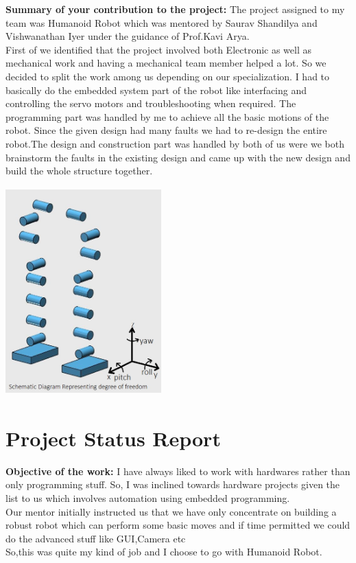 \documentclass{article}
\begin{document}
\hspace{-5mm}\textbf{Summary of your contribution to the project:} The project assigned to my team was Humanoid Robot which was mentored by Saurav Shandilya and Vishwanathan Iyer under the guidance of Prof.Kavi Arya.\\
First of we identified that the project involved both Electronic as well as mechanical work and having a mechanical team member helped a lot. So we decided to split the work among us depending on our specialization. I had to basically do the embedded system part of the robot like interfacing and controlling the servo motors and troubleshooting when required. The programming part was handled by me to achieve all the basic motions of the robot. Since the given design had many faults we had to re-design the entire robot.The design and construction part was handled by both of us were we both brainstorm
the faults in the existing design and came up with the new design and build the whole structure together. 
\begin{center}
\includegraphics[width=6cm, height=8cm]{Schematic}
\end{center}
\newpage
\section{Project Status Report}
\textbf{Objective of the work:} I have always liked to work with hardwares rather than only programming stuff. So, I was inclined towards hardware projects given the list to us which involves automation using embedded programming.  \\
Our mentor initially instructed us that we have only concentrate on building a robust robot which can perform some basic moves and if time permitted we could do the advanced stuff like GUI,Camera etc\\
So,this was quite my kind of job and I choose to go with Humanoid Robot.\\
\end{document}
